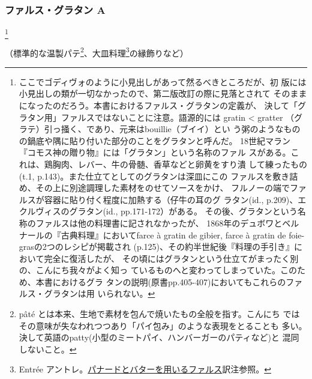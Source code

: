\begin{recette}
\maeaki


\hypertarget{farce-gratin-a}{%
\subsubsection{ファルス・グラタン A}\label{farce-gratin-a}}

\footnote{ここでゴディヴォのように小見出しがあって然るべきところだが、初
  版には小見出しの類が一切なかったので、第二版改訂の際に見落とされて
  そのままになったのだろう。本書におけるファルス・グラタンの定義が、
  決して「グラタン用」ファルスではないことに注意。語源的には gratin
  \textless{} gratter
  （グラテ）引っ掻く、であり、元来はbouillie（ブイイ）とい
  う粥のようなものの鍋底や隅に貼り付いた部分のことをグラタンと呼んだ。
  18世紀マラン『コモス神の贈り物』には「グラタン」という名称のファル
  スがある。これは、鶏胸肉、レバー、牛の骨髄、香草などと卵黄をすり潰
  して練ったもの(t.1, p.143)。また仕立てとしてのグラタンは深皿にこの
  ファルスを敷き詰め、その上に別途調理した素材をのせてソースをかけ、
  フルノーの端でファルスが容器に貼り付く程度に加熱する（仔牛の耳のグ
  ラタン(id., p.209)、エクルヴィスのグラタン(id., pp.171-172）がある。
  その後、グラタンという名称のファルスは他の料理書に記されなかったが、
  1868年のデュボワとベルナールの『古典料理』においてfarce à gratin de
  gibier, farce à gratin de foie-grasの2つのレシピが掲載され
  (p.125)、その約半世紀後『料理の手引き』において完全に復活したが、
  その頃にはグラタンという仕立てがまったく別の、こんにち我々がよく知っ
  ているものへと変わってしまっていた。このため、本書におけるグラ
  タンの説明(原書pp.405-407)においてもこれらのファルス・グラタンは用
  いられない。}


（標準的な温製パテ\footnote{pâté
  とは本来、生地で素材を包んで焼いたもの全般を指す。こんにち
  ではその意味が失なわれつつあり「パイ包み」のような表現をとることも
  多い。決して英語のpatty(小型のミートパイ、ハンバーガーのパティなど)と
  混同しないこと。}、大皿料理\footnote{Entrée
  アントレ。\protect\hyperlink{panade-a}{パナードとバターを用いるファルス}訳注参照。}の縁飾りなど）


\end{recette}
